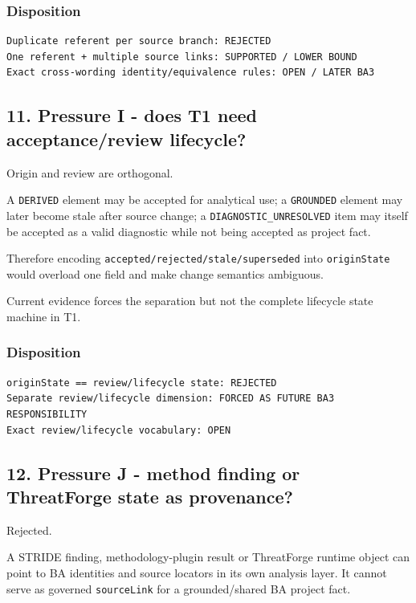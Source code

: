 \documentclass[11pt,a4paper]{article}
\begin{document}
\subsubsection{Disposition}\label{disposition-7}

\begin{verbatim}
Duplicate referent per source branch: REJECTED
One referent + multiple source links: SUPPORTED / LOWER BOUND
Exact cross-wording identity/equivalence rules: OPEN / LATER BA3
\end{verbatim}

\subsection{11. Pressure I - does T1 need acceptance/review lifecycle?}\label{11-pressure-i---does-t1-need-acceptancereview-lifecycle}

Origin and review are orthogonal.

A \texttt{DERIVED} element may be accepted for analytical use; a \texttt{GROUNDED} element may later become stale after source change; a \texttt{DIAGNOSTIC\_UNRESOLVED} item may itself be accepted as a valid diagnostic while not being accepted as project fact.

Therefore encoding \texttt{accepted/rejected/stale/superseded} into \texttt{originState} would overload one field and make change semantics ambiguous.

Current evidence forces the separation but not the complete lifecycle state machine in T1.

\subsubsection{Disposition}\label{disposition-8}

\begin{verbatim}
originState == review/lifecycle state: REJECTED
Separate review/lifecycle dimension: FORCED AS FUTURE BA3 RESPONSIBILITY
Exact review/lifecycle vocabulary: OPEN
\end{verbatim}

\subsection{12. Pressure J - method finding or ThreatForge state as provenance?}\label{12-pressure-j---method-finding-or-threatforge-state-as-provenance}

Rejected.

A STRIDE finding, methodology-plugin result or ThreatForge runtime object can point to BA identities and source locators in its own analysis layer. It cannot serve as governed \texttt{sourceLink} for a grounded/shared BA project fact.
\end{document}
